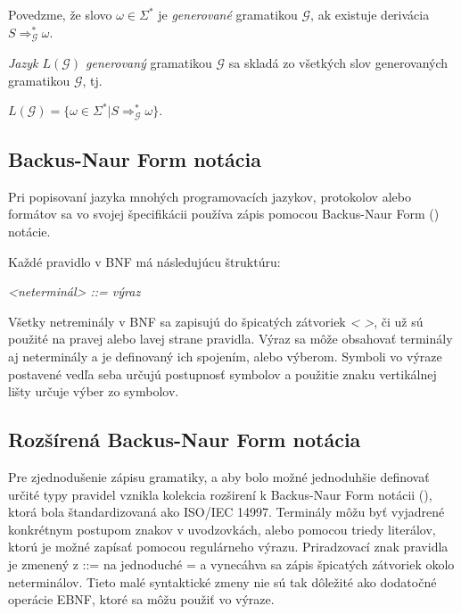 \begin{definice}
Povedzme, že slovo $\omega \in \Sigma^*$ je \textit{generované} gramatikou $\mathcal{G}$, ak existuje derivácia $S\Rightarrow_\mathcal{G}^*\omega$.

\textit{Jazyk $L(\mathcal{G})$ generovaný} gramatikou $\mathcal{G}$ sa skladá zo všetkých slov generovaných gramatikou $\mathcal{G}$, tj.
\begin{center}
$L(\mathcal{G}) = \{\omega \in \Sigma^* | S \Rightarrow_\mathcal{G}^* \omega\}$.\cite{demlova:gramatiky}
\end{center}
\end{definice}

\subsection{Backus-Naur Form notácia}\label{BNF}
Pri popisovaní jazyka mnohých programovacích jazykov, protokolov alebo formátov sa vo svojej špecifikácii používa zápis pomocou Backus-Naur Form () notácie.\cite{might:languages} 

Každé pravidlo v BNF má následujúcu štruktúru:
\begin{center}
\textit{<neterminál> ::= výraz}
\end{center}

Všetky netreminály v BNF sa zapisujú do špicatých zátvoriek \textit{< >}, či už sú použité na pravej alebo lavej strane pravidla. Výraz sa môže obsahovať terminály aj neterminály a je definovaný ich spojením, alebo výberom. Symboli vo výraze postavené vedľa seba určujú postupnosť symbolov a použitie znaku vertikálnej lišty určuje výber zo symbolov.

\subsection{Rozšírená Backus-Naur Form notácia}\label{EBNF}
Pre zjednodušenie zápisu gramatiky, a aby bolo možné jednoduhšie definovať určité typy pravidel vznikla kolekcia rozširení k Backus-Naur Form notácii (), ktorá bola štandardizovaná ako ISO/IEC 14997\cite{ISO14977}. Terminály môžu byť vyjadrené konkrétnym postupom znakov v uvodzovkách, alebo pomocou triedy literálov, ktorú je možné zapísať pomocou regulárneho výrazu. Priradzovací znak pravidla je zmenený z ::= na jednoduché = a vynecáhva sa zápis špicatých zátvoriek okolo neterminálov. Tieto malé syntaktické zmeny nie sú tak dôležité ako dodatočné operácie EBNF, ktoré sa môžu použiť vo výraze.

